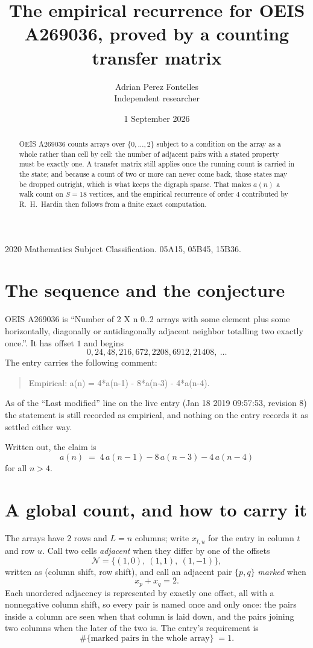 \documentclass[11pt,a4paper]{article}
\title{The empirical recurrence for OEIS A269036, proved by a counting transfer matrix}
\author{Adrian Perez Fontelles\\ \small Independent researcher}
\date{1 September 2026}
\theoremstyle{plain}
\theoremstyle{definition}
\begin{document}
\maketitle

\begin{abstract}
OEIS A269036 counts arrays over $\{0,\dots,2\}$ subject to a condition on the array as a
whole rather than cell by cell: the number of adjacent pairs with a stated property must be
exactly one. A transfer matrix still applies once the running count is carried in the state; and
because a count of two or more can never come back, those states may be dropped outright,
which is what keeps the digraph sparse. That makes $a(n)$ a walk count on $S=18$ vertices,
and the empirical recurrence of order $4$ contributed by R.~H.~Hardin then follows from
a finite exact computation.
\end{abstract}

\noindent\small 2020 Mathematics Subject Classification. 05A15, 05B45, 15B36.\normalsize

\section{The sequence and the conjecture}

OEIS A269036 is ``Number of 2 X n 0..2 arrays with some element plus some horizontally, diagonally or antidiagonally adjacent neighbor totalling two exactly once.''. It has offset $1$ and begins
\[
0, 24, 48, 216, 672, 2208, 6912, 21408,\ \dots
\]
The entry carries the following comment:
\begin{quote}\small
Empirical: a(n) = 4*a(n-1) - 8*a(n-3) - 4*a(n-4).
\end{quote}
As of the ``Last modified'' line on the live entry (Jan 18 2019 09:57:53, revision 8) the statement is
still recorded as empirical, and nothing on the entry records it as settled either way.

Written out, the claim is
\begin{equation}\label{eq:conj}
a(n)\;=\;4\,a(n-1) - 8\,a(n-3) - 4\,a(n-4)
\end{equation}
for all $n>4$.

\section{A global count, and how to carry it}

The arrays have $2$ rows and $L=n$ columns; write $x_{t,u}$ for the entry in
column $t$ and row $u$. Call two cells \emph{adjacent} when they differ by one of the
offsets
\[
\mathcal N=\{(1,0),\ (1,1),\ (1,-1)\},
\]
written as (column shift, row shift), and call an adjacent pair $\{p,q\}$
\emph{marked} when
\[
x_{p}+x_{q}=2 .
\]
Each unordered adjacency is represented by exactly one offset, all with a nonnegative column
shift, so every pair is named once and only once: the pairs inside a column are seen when
that column is laid down, and the pairs joining two columns when the later of the two is. The
entry's requirement is
\begin{equation}\label{eq:glob}
\#\{\text{marked pairs in the whole array}\}\;=1.
\end{equation}
\end{document}
